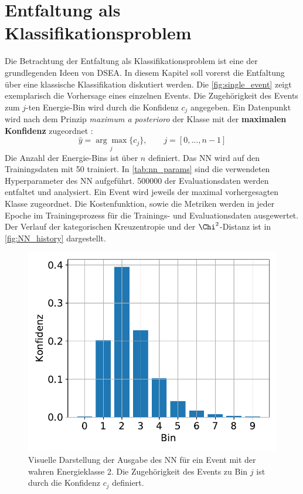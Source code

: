\section{Entfaltung als Klassifikationsproblem} \label{sec:nn_no_dsea}
Die Betrachtung der Entfaltung als Klassifikationsproblem ist eine der grundlegenden Ideen von DSEA.
In diesem Kapitel soll vorerst die Entfaltung über eine klassische Klassifikation diskutiert werden.
Die \autoref{fig:single_event} zeigt exemplarisch die Vorhersage eines einzelnen Events.
Die Zugehörigkeit des Events zum $j$-ten Energie-Bin wird durch die Konfidenz $c_j$ angegeben.
Ein Datenpunkt wird nach dem Prinzip \textit{maximum a posterioro} der Klasse mit der \textbf{maximalen Konfidenz} zugeordnet \cite{max_pred}:
\begin{equation*}
    \hat{y} = \underset{j}{\arg\max} \{ c_j \}, \qquad j=[0,...,n-1]
\end{equation*}
Die Anzahl der Energie-Bins ist über $n$ definiert.
Das NN wird auf den Trainingsdaten mit \SI{50}{} trainiert.
In \autoref{tab:nn_params} sind die verwendeten Hyperparameter des NN aufgeführt.
\SI{500000}{} der Evaluationsdaten werden entfaltet und analysiert.
Ein Event wird jeweils der maximal vorhergesagten Klasse zugeordnet.
Die Kostenfunktion, sowie die Metriken werden in jeder Epoche im Trainingsprozess für die Trainings- und Evaluationsdaten ausgewertet.
Der Verlauf der kategorischen Kreuzentropie und der $\Chi^2$-Distanz ist in \autoref{fig:NN_history} dargestellt.
\\
\begin{figure} %
    \centering
    \includegraphics[width=.5\textwidth]{Plots/NN/single_events_class2.pdf}
    \caption[Graphische Darstellung der Ausgabe des NN]{Visuelle Darstellung der Ausgabe des NN für ein Event mit der wahren Energieklasse 2.
    Die Zugehörigkeit des Events zu Bin $j$ ist durch die Konfidenz $c_j$ definiert.
    }
    \label{fig:single_event}
\end{figure}
